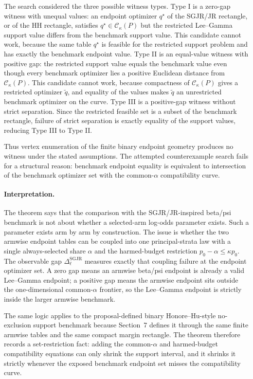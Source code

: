 The search considered the three possible witness types.  Type I is a zero-gap witness with unequal values: an endpoint optimizer \(q^\star\) of the SGJR/JR rectangle, or of the HH rectangle, satisfies \(q^\star\in\mathcal C_\kappa(P)\) but the restricted Lee--Gamma support value differs from the benchmark support value.  This candidate cannot work, because the same table \(q^\star\) is feasible for the restricted support problem and has exactly the benchmark endpoint value.  Type II is an equal-value witness with positive gap: the restricted support value equals the benchmark value even though every benchmark optimizer lies a positive Euclidean distance from \(\mathcal C_\kappa(P)\).  This candidate cannot work, because compactness of \(\mathcal C_\kappa(P)\) gives a restricted optimizer \(\tilde q\), and equality of the values makes \(\tilde q\) an unrestricted benchmark optimizer on the curve.  Type III is a positive-gap witness without strict separation.  Since the restricted feasible set is a subset of the benchmark rectangle, failure of strict separation is exactly equality of the support values, reducing Type III to Type II.

Thus vertex enumeration of the finite binary endpoint geometry produces no witness under the stated assumptions.  The attempted counterexample search fails for a structural reason: benchmark endpoint equality is equivalent to intersection of the benchmark optimizer set with the common-\(\alpha\) compatibility curve.

\paragraph{Interpretation.}
The theorem says that the comparison with the SGJR/JR-inspired beta/psi benchmark is not about whether a selected-arm log-odds parameter exists.  Such a parameter exists arm by arm by construction.  The issue is whether the two armwise endpoint tables can be coupled into one principal-strata law with a single always-selected share \(\alpha\) and the harmed-budget restriction \(p_0-\alpha\le\kappa p_0\).  The observable gap \(\Delta_\ell^{\mathrm{SGJR}}\) measures exactly that coupling failure at the endpoint optimizer set.  A zero gap means an armwise beta/psi endpoint is already a valid Lee--Gamma endpoint; a positive gap means the armwise endpoint sits outside the one-dimensional common-\(\alpha\) frontier, so the Lee--Gamma endpoint is strictly inside the larger armwise benchmark.

The same logic applies to the proposal-defined binary Honore--Hu-style no-exclusion support benchmark because Section~7 defines it through the same finite armwise tables and the same compact margin rectangle.  The theorem therefore records a set-restriction fact: adding the common-\(\alpha\) and harmed-budget compatibility equations can only shrink the support interval, and it shrinks it strictly whenever the exposed benchmark endpoint set misses the compatibility curve.

